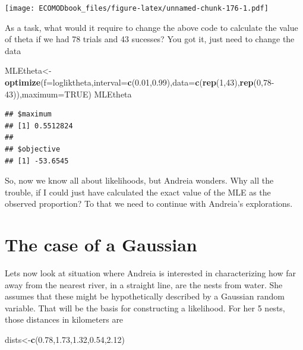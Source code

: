 \documentclass[
]{book}
\newenvironment{Shaded}{\begin{snugshade}}{\end{snugshade}}
\newcommand{\DataTypeTok}[1]{\textcolor[rgb]{0.13,0.29,0.53}{#1}}
\newcommand{\DecValTok}[1]{\textcolor[rgb]{0.00,0.00,0.81}{#1}}
\newcommand{\FloatTok}[1]{\textcolor[rgb]{0.00,0.00,0.81}{#1}}
\newcommand{\KeywordTok}[1]{\textcolor[rgb]{0.13,0.29,0.53}{\textbf{#1}}}
\newcommand{\NormalTok}[1]{#1}
\newcommand{\OtherTok}[1]{\textcolor[rgb]{0.56,0.35,0.01}{#1}}
\begin{document}
\texttt{[image: ECOMODbook\_files/figure-latex/unnamed-chunk-176-1.pdf]}

As a task, what would it require to change the above code to calculate the value of theta if we had 78 trials and 43 sucesses? You got it, just need to change the data

\begin{Shaded}
\begin{Highlighting}[]
\NormalTok{MLEtheta<-}\KeywordTok{optimize}\NormalTok{(}\DataTypeTok{f=}\NormalTok{logliktheta,}\DataTypeTok{interval=}\KeywordTok{c}\NormalTok{(}\FloatTok{0.01}\NormalTok{,}\FloatTok{0.99}\NormalTok{),}\DataTypeTok{data=}\KeywordTok{c}\NormalTok{(}\KeywordTok{rep}\NormalTok{(}\DecValTok{1}\NormalTok{,}\DecValTok{43}\NormalTok{),}\KeywordTok{rep}\NormalTok{(}\DecValTok{0}\NormalTok{,}\DecValTok{78-43}\NormalTok{)),}\DataTypeTok{maximum=}\OtherTok{TRUE}\NormalTok{)}
\NormalTok{MLEtheta}
\end{Highlighting}
\end{Shaded}

\begin{verbatim}
## $maximum
## [1] 0.5512824
## 
## $objective
## [1] -53.6545
\end{verbatim}

So, now we know all about likelihoods, but Andreia wonders. Why all the trouble, if I could just have calculated the exact value of the MLE as the observed proportion? To that we need to continue with Andreia's explorations.

\hypertarget{the-case-of-a-gaussian}{%
\section{The case of a Gaussian}\label{the-case-of-a-gaussian}}

Lets now look at situation where Andreia is interested in characterizing how far away from the nearest river, in a straight line, are the nests from water. She assumes that these might be hypothetically described by a Gaussian random variable. That will be the basis for constructing a likelihood. For her 5 nests, those distances in kilometers are

\begin{Shaded}
\begin{Highlighting}[]
\NormalTok{dists<-}\KeywordTok{c}\NormalTok{(}\FloatTok{0.78}\NormalTok{,}\FloatTok{1.73}\NormalTok{,}\FloatTok{1.32}\NormalTok{,}\FloatTok{0.54}\NormalTok{,}\FloatTok{2.12}\NormalTok{)}
\end{Highlighting}
\end{Shaded}
\end{document}
